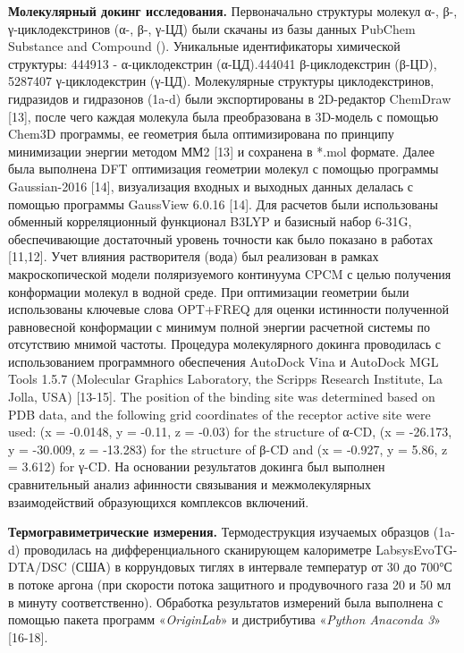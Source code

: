 {\bfseries Молекулярный докинг исследования.} Первоначально структуры
молекул α-, β-, γ-циклодекстринов (α-, β-, γ-ЦД) были скачаны из базы
данных PubChem Substance and Compound
(\href{https://pubchem.ncbi.nlm.nih.gov/}{}).
Уникальные идентификаторы химической структуры: 444913 - α-циклодекстрин
(α-ЦД).444041 β-циклодекстрин (β-ЦD), 5287407 γ-циклодекстрин (γ-ЦД).
Молекулярные структуры циклодекстринов, гидразидов и гидразонов (1a-d)
были экспортированы в 2D-редактор ChemDraw {[}13{]}, после чего каждая
молекула была преобразована в 3D-модель с помощью Chem3D программы, ее
геометрия была оптимизирована по принципу минимизации энергии методом
ММ2 {[}13{]} и сохранена в *.mol формате. Далее была выполнена DFT
оптимизация геометрии молекул с помощью программы Gaussian-2016
{[}14{]}, визуализация входных и выходных данных делалась с помощью
программы GaussView 6.0.16 {[}14{]}. Для расчетов были использованы
обменный корреляционный функционал B3LYP и базисный набор 6-31G,
обеспечивающие достаточный уровень точности как было показано в работах
{[}11,12{]}. Учет влияния растворителя (вода) был реализован в рамках
макроскопической модели поляризуемого континуума CPCM с целью получения
конформации молекул в водной среде. При оптимизации геометрии были
использованы ключевые слова OPT+FREQ для оценки истинности полученной
равновесной конформации с минимум полной энергии расчетной системы по
отсутствию мнимой частоты. Процедура молекулярного докинга проводилась с
использованием программного обеспечения AutoDock Vina и AutoDock MGL
Tools 1.5.7 (Molecular Graphics Laboratory, the Scripps Research
Institute, La Jolla, USA) {[}13-15{]}. The position of the binding site
was determined based on PDB data, and the following grid coordinates of
the receptor active site were used: (x = -0.0148, y = -0.11, z = -0.03)
for the structure of α-CD, (x = -26.173, y = -30.009, z = -13.283) for
the structure of β-CD and (x = -0.927, y = 5.86, z = 3.612) for γ-CD. На
основании результатов докинга был выполнен сравнительный анализ
афинности связывания и межмолекулярных взаимодействий образующихся
комплексов включений.

{\bfseries Термогравиметрические измерения.} Термодеструкция изучаемых
образцов (1a-d) проводилась на дифференциального сканирующем калориметре
LabsysEvoTG-DTA/DSC (США) в коррундовых тиглях в интервале температур от
30 до 700°С в потоке аргона (при скорости потока защитного и
продувочного газа 20 и 50 мл в минуту соответственно). Обработка
результатов измерений была выполнена с помощью пакета программ
«\emph{OriginLab}» и дистрибутива «\emph{Python Anaconda 3}»
{[}16-18{]}.

